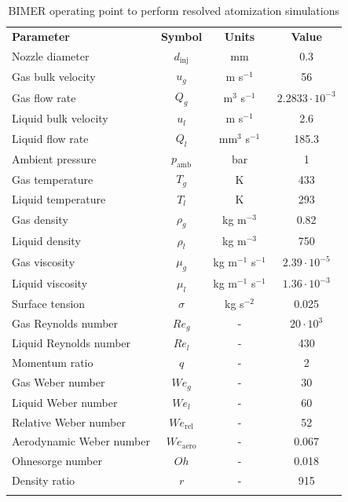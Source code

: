 \begin{table}[!h]
\centering
\caption{BIMER operating point to perform resolved atomization simulations}
\begin{tabular}{lccc}
\thickhline
\textbf{Parameter} & \textbf{Symbol} & \textbf{Units} &  \textbf{Value} \\
\thickhline
Nozzle diameter & $d_\mathrm{inj}$ & mm & 0.3 \\
Gas bulk velocity & $u_g$ & m s$^{-1}$ & 56 \\
Gas flow rate & $Q_g$ & m$^3$ s$^{-1}$ & $2.2833 \cdot 10^{-3}$   \\
Liquid bulk velocity & $u_l$ & m s$^{-1}$ & 2.6  \\
Liquid flow rate & $Q_l$ & mm$^3$ s$^{-1}$ & 185.3  \\
Ambient pressure & $p_\mathrm{amb}$ & bar &  1 \\
Gas temperature & $T_g$ & K & 433 \\
Liquid temperature & $T_l$ & K & 293 \\
Gas density & $\rho_g$ & kg m$^{-3}$ & 0.82 \\
Liquid density & $\rho_l$ & kg m$^{-3}$ & 750 \\
Gas viscosity & $\mu_g$ & kg m$^{-1}$ s$^{-1}$ & $2.39 \cdot 10^{-5}$ \\
Liquid viscosity & $\mu_l$ & kg m$^{-1}$ s$^{-1}$ &  $1.36 \cdot 10^{-3}$ \\
Surface tension & $\sigma$ & kg s$^{-2}$ &  0.025  \\
\thickhline
Gas Reynolds number & $Re_g$ & - & $20 \cdot 10^3$ \\ %
Liquid Reynolds number & $Re_l$ & - & 430 \\
Momentum ratio & $q$ & - & 2 \\ %
Gas Weber number & $We_g$ & - & 30 \\ %
Liquid Weber number & $We_l$ & - & 60 \\
Relative Weber number & $We_\mathrm{rel}$ & - & 52 \\ %
Aerodynamic Weber number & $We_\mathrm{aero}$ & - & 0.067 \\
Ohnesorge number & $Oh $ & - & 0.018 \\
Density ratio & $r$ & - & 915 \\
\thickhline
\end{tabular}
\label{tab:bimer_sps_operating_point}
\end{table}

